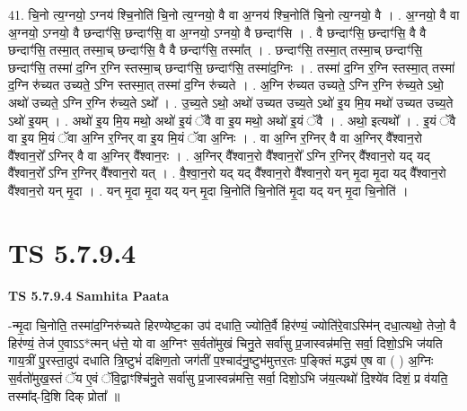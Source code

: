 \documentclass[17pt]{extarticle}
\begin{document}
41. चि॒नो त्य॒ग्नयो॒ ऽग्नय॑ श्चि॒नोति॑ चि॒नो त्य॒ग्नयो॒ वै वा अ॒ग्नय॑ श्चि॒नोति॑ चि॒नो त्य॒ग्नयो॒ वै । . अ॒ग्नयो॒ वै वा अ॒ग्नयो॒ ऽग्नयो॒ वै छन्दाꣳ॑सि॒ छन्दाꣳ॑सि॒ वा अ॒ग्नयो॒ ऽग्नयो॒ वै छन्दाꣳ॑सि । . वै छन्दाꣳ॑सि॒ छन्दाꣳ॑सि॒ वै वै छन्दाꣳ॑सि॒ तस्मा॒त् तस्मा॒च् छन्दाꣳ॑सि॒ वै वै छन्दाꣳ॑सि॒ तस्मा᳚त् । . छन्दाꣳ॑सि॒ तस्मा॒त् तस्मा॒च् छन्दाꣳ॑सि॒ छन्दाꣳ॑सि॒ तस्मा॑ द॒ग्नि र॒ग्नि स्तस्मा॒च् छन्दाꣳ॑सि॒ छन्दाꣳ॑सि॒ तस्मा॑द॒ग्निः । . तस्मा॑ द॒ग्नि र॒ग्नि स्तस्मा॒त् तस्मा॑ द॒ग्नि रु॑च्यत उच्यते॒ ऽग्नि स्तस्मा॒त् तस्मा॑ द॒ग्नि रु॑च्यते । . अ॒ग्नि रु॑च्यत उच्यते॒ ऽग्नि र॒ग्नि रु॑च्य॒ते ऽथो॒ अथो॑ उच्यते॒ ऽग्नि र॒ग्नि रु॑च्य॒ते ऽथो᳚ । . उ॒च्य॒ते ऽथो॒ अथो॑ उच्यत उच्य॒ते ऽथो॑ इ॒य मि॒य मथो॑ उच्यत उच्य॒ते ऽथो॑ इ॒यम् । . अथो॑ इ॒य मि॒य मथो॒ अथो॑ इ॒यं ॅवै वा इ॒य मथो॒ अथो॑ इ॒यं ॅवै । . अथो॒ इत्यथो᳚ । . इ॒यं ॅवै वा इ॒य मि॒यं ॅवा अ॒ग्नि र॒ग्निर् वा इ॒य मि॒यं ॅवा अ॒ग्निः । . वा अ॒ग्नि र॒ग्निर् वै वा अ॒ग्निर् वै᳚श्वान॒रो वै᳚श्वान॒रो᳚ ऽग्निर् वै वा अ॒ग्निर् वै᳚श्वान॒रः । . अ॒ग्निर् वै᳚श्वान॒रो वै᳚श्वान॒रो᳚ ऽग्नि र॒ग्निर् वै᳚श्वान॒रो यद् यद् वै᳚श्वान॒रो᳚ ऽग्नि र॒ग्निर् वै᳚श्वान॒रो यत् । . वै॒श्वा॒न॒रो यद् यद् वै᳚श्वान॒रो वै᳚श्वान॒रो यन् मृ॒दा मृ॒दा यद् वै᳚श्वान॒रो वै᳚श्वान॒रो यन् मृ॒दा । . यन् मृ॒दा मृ॒दा यद् यन् मृ॒दा चि॒नोति॑ चि॒नोति॑ मृ॒दा यद् यन् मृ॒दा चि॒नोति॑ । \newline
\pagebreak
{}

\section{ TS 5.7.9.4 }

\textbf{TS 5.7.9.4 } \newline
\textbf{Samhita Paata} \newline

-न्मृ॒दा चि॒नोति॒ तस्मा॑द॒ग्निरु॑च्यते हिरण्येष्ट॒का उप॑ दधाति॒ ज्योति॒र्वै हिर॑ण्यं॒ ज्योति॑रे॒वाऽस्मि॑न् दधा॒त्यथो॒ तेजो॒ वै हिर॑ण्यं॒ तेज॑ ए॒वाऽऽ*त्मन् ध॑त्ते॒ यो वा अ॒ग्निꣳ स॒र्वतो॑मुखं चिनु॒ते सर्वा॑सु प्र॒जास्वन्न॑मत्ति॒ सर्वा॒ दिशो॒ऽभि ज॑यति गाय॒त्रीं पु॒रस्ता॒दुप॑ दधाति त्रि॒ष्टुभं॑ दक्षिण॒तो जग॑तीं प॒श्चाद॑नु॒ष्टुभ॑मुत्तर॒तः प॒ङ्क्तिं मद्ध्य॑ ए॒ष वा ( ) अ॒ग्निः स॒र्वतो॑मुख॒स्तं ॅय ए॒वं ॅवि॒द्वाꣳश्चि॑नु॒ते सर्वा॑सु प्र॒जास्वन्न॑मत्ति॒ सर्वा॒ दिशो॒ऽभि ज॑य॒त्यथो॑ दि॒श्ये॑व दिशं॒ प्र व॑यति॒ तस्मा᳚द्-दि॒शि दिक् प्रोता᳚ ॥ \newline
\end{document}

